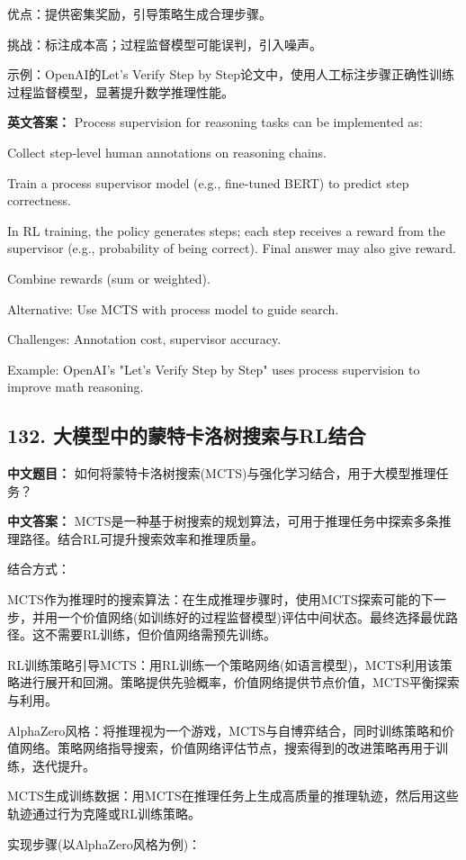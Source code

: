 \documentclass[10pt,a4paper]{ctexart}
\begin{document}
优点：提供密集奖励，引导策略生成合理步骤。

挑战：标注成本高；过程监督模型可能误判，引入噪声。

示例：OpenAI的Let's Verify Step by Step论文中，使用人工标注步骤正确性训练过程监督模型，显著提升数学推理性能。

\textbf{英文答案：}
Process supervision for reasoning tasks can be implemented as:

Collect step-level human annotations on reasoning chains.

Train a process supervisor model (e.g., fine-tuned BERT) to predict step correctness.

In RL training, the policy generates steps; each step receives a reward from the supervisor (e.g., probability of being correct). Final answer may also give reward.

Combine rewards (sum or weighted).

Alternative: Use MCTS with process model to guide search.

Challenges: Annotation cost, supervisor accuracy.

Example: OpenAI's "Let's Verify Step by Step" uses process supervision to improve math reasoning.

\subsection*{132. 大模型中的蒙特卡洛树搜索与RL结合}
\textbf{中文题目：} 如何将蒙特卡洛树搜索(MCTS)与强化学习结合，用于大模型推理任务？

\textbf{中文答案：}
MCTS是一种基于树搜索的规划算法，可用于推理任务中探索多条推理路径。结合RL可提升搜索效率和推理质量。

结合方式：

MCTS作为推理时的搜索算法：在生成推理步骤时，使用MCTS探索可能的下一步，并用一个价值网络(如训练好的过程监督模型)评估中间状态。最终选择最优路径。这不需要RL训练，但价值网络需预先训练。

RL训练策略引导MCTS：用RL训练一个策略网络(如语言模型)，MCTS利用该策略进行展开和回溯。策略提供先验概率，价值网络提供节点价值，MCTS平衡探索与利用。

AlphaZero风格：将推理视为一个游戏，MCTS与自博弈结合，同时训练策略和价值网络。策略网络指导搜索，价值网络评估节点，搜索得到的改进策略再用于训练，迭代提升。

MCTS生成训练数据：用MCTS在推理任务上生成高质量的推理轨迹，然后用这些轨迹通过行为克隆或RL训练策略。

实现步骤(以AlphaZero风格为例)：
\end{document}
